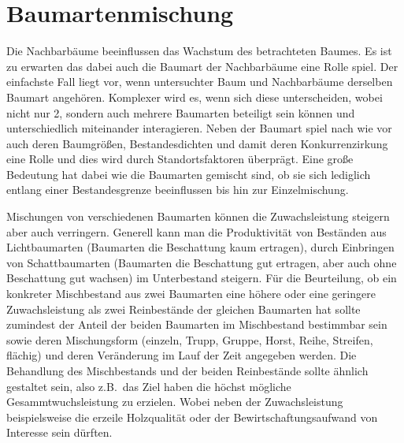 \documentclass[twocolumn]{scrartcl}
\begin{document}
\section{Baumartenmischung}

Die Nachbarbäume beeinflussen das Wachstum des betrachteten Baumes. Es ist zu
erwarten das dabei auch die Baumart der Nachbarbäume eine Rolle spiel. Der
einfachste Fall liegt vor, wenn untersuchter Baum und Nachbarbäume derselben
Baumart angehören. Komplexer wird es, wenn sich diese unterscheiden, wobei nicht
nur 2, sondern auch mehrere Baumarten beteiligt sein können und unterschiedlich
miteinander interagieren. Neben der Baumart spiel nach wie vor auch deren
Baumgrößen, Bestandesdichten und damit deren Konkurrenzirkung eine Rolle und
dies wird durch Standortsfaktoren überprägt. Eine große Bedeutung hat dabei wie
die Baumarten gemischt sind, ob sie sich lediglich entlang einer Bestandesgrenze
beeinflussen bis hin zur Einzelmischung.

Mischungen von verschiedenen Baumarten können die Zuwachsleistung steigern aber
auch verringern. Generell kann man die Produktivität von Beständen aus
Lichtbaumarten (Baumarten die Beschattung kaum ertragen), durch Einbringen von
Schattbaumarten (Baumarten die Beschattung gut ertragen, aber auch ohne
Beschattung gut wachsen) im Unterbestand steigern. Für die Beurteilung, ob ein
konkreter Mischbestand aus zwei Baumarten eine höhere oder eine geringere
Zuwachsleistung als zwei Reinbestände der gleichen Baumarten hat sollte
zumindest der Anteil der beiden Baumarten im Mischbestand bestimmbar sein sowie
deren Mischungsform (einzeln, Trupp, Gruppe, Horst, Reihe, Streifen, flächig)
und deren Veränderung im Lauf der Zeit angegeben werden. Die Behandlung des
Mischbestands und der beiden Reinbestände sollte ähnlich gestaltet sein, also
z.B.\ das Ziel haben die höchst mögliche Gesammtwuchsleistung zu erzielen. Wobei
neben der Zuwachsleistung beispielsweise die erzeile Holzqualität oder der
Bewirtschaftungsaufwand von Interesse sein dürften.



\end{document}
